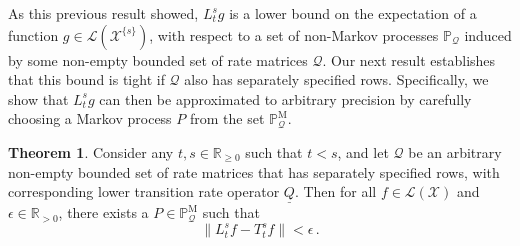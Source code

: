 \documentclass[10pt]{paper}
\theoremstyle{definition}
\newtheorem{theorem}{Theorem}
\newcommand{\reals}{\mathbb{R}}
\newcommand{\realspos}{\reals_{>0}}
\newcommand{\realsnonneg}{\reals_{\geq 0}}
\newcommand{\states}{\mathcal{X}}
\newcommand{\processes}{\mathbb{P}}
\newcommand{\mprocesses}{\processes^{\mathrm{M}}}
\newcommand{\lbound}{L}
\newcommand{\gambles}{\mathcal{L}}
\newcommand{\gamblesX}{\gambles(\states)}
\newcommand{\rateset}{\mathcal{Q}}
\newcommand{\lrate}{\underline{Q}}
\newcommand{\norm}[1]{\left\lVert #1 \right\rVert}
\begin{document}
As this previous result showed, $L_t^sg$ is a lower bound on the expectation of a function $g\in\gambles(\states^{\{s\}})$, with respect to a set of non-Markov processes $\processes_\rateset$ induced by some non-empty bounded set of rate matrices $\rateset$. Our next result establishes that this bound is tight if $\rateset$ also has separately specified rows. Specifically, we show that $L_t^sg$ can then be approximated to arbitrary precision by carefully choosing a Markov process $P$ from the set $\mprocesses_\rateset$.

\begin{theorem}\label{theorem:lower_markov_bound_is_tight}
Consider any $t,s\in\realsnonneg$ such that $t<s$, and let $\rateset$ be an arbitrary non-empty bounded set of rate matrices that has separately specified rows, with corresponding lower transition rate operator $\lrate$. Then for all $f\in\gamblesX$ and $\epsilon\in\realspos$, there exists a $P\in\mprocesses_{\rateset}$ such that
\begin{equation*}
\norm{\lbound_t^sf-T_t^sf} < \epsilon\,.
\end{equation*}
\end{theorem}
\end{document}
